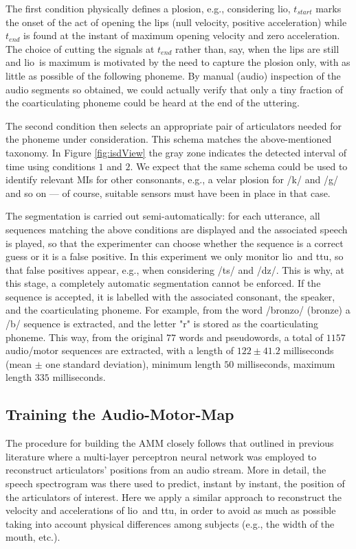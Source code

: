 \documentclass[10pt]{article}
\newcommand{\lio}{\textsf{lio}}
\newcommand{\ttu}{\textsf{ttu}}
\begin{document}
The first condition physically defines a plosion, e.g., considering \lio, $t_{start}$
marks the onset of the act of opening the lips (null velocity, positive acceleration)
while $t_{end}$ is found at the instant of maximum opening velocity and zero acceleration.
The choice of cutting the signals at $t_{end}$ rather than, say, when the lips are still
and \lio\ is maximum is motivated by the need to capture the plosion only, with as little
as possible of the following phoneme. By manual (audio) inspection of the audio segments so
obtained, we could actually verify that only a tiny fraction of the coarticulating phoneme
could be heard at the end of the uttering.

The second condition then selects an appropriate pair of articulators needed for the
phoneme under consideration. This schema matches the above-mentioned taxonomy. In Figure
\ref{fig:isdView} the gray zone indicates the detected interval of time using conditions
$1$ and $2$. We expect that the same schema could be used to identify relevant MIs for
other consonants, e.g., a velar plosion for /k/ and /g/ and so on --- of course, suitable
sensors must have been in place in that case.

The segmentation is carried out semi-automatically: for each
utterance, all sequences matching the above conditions are displayed and the
associated speech is played, so that the experimenter can choose whether the
sequence is a correct guess or it is a false positive. In this experiment we only
monitor \lio\ and \ttu, so that false positives appear, e.g., when considering
/ts/ and /dz/. This is why, at this stage, a completely automatic segmentation
cannot be enforced. If the sequence is accepted, it is labelled
with the associated consonant, the speaker, and the
coarticulating phoneme. For example, from the word /bronzo/ (bronze) a /b/
sequence is extracted, and the letter "r" is stored as the coarticulating phoneme.
This way, from the original $77$ words and pseudowords, a total
of $1157$ audio/motor sequences are extracted, with a length of $122 \pm 41.2$
milliseconds (mean $\pm$ one standard deviation), minimum length $50$ milliseconds,
maximum length $335$ milliseconds.


\subsection*{Training the Audio-Motor-Map}
\label{subsec:amm_setup}

The procedure for building the AMM closely follows that outlined in previous
literature \cite{papcun,richmond,richmond2007} where a multi-layer perceptron
neural network was employed to reconstruct articulators' positions from an
audio stream. More in detail, the speech spectrogram was there used to predict,
instant by instant, the position of the articulators of interest. Here we apply
a similar approach to reconstruct the velocity and accelerations of \lio\ and \ttu,
in order to avoid as much as possible taking into account physical differences
among subjects (e.g., the width of the mouth, etc.).
\end{document}
